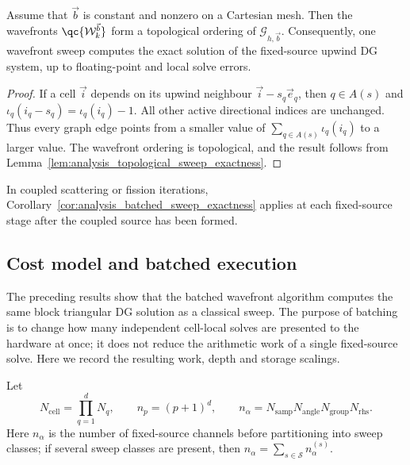 \documentclass[final]{amsart}
\begin{document}
\begin{corollary}
\label{cor:analysis_cartesian_wavefront_exactness}
Assume that $\vec b$ is constant and nonzero on a Cartesian mesh. Then
the wavefronts $\qc{\mathcal{W}^{\vec b}_k}$ form a topological ordering
of $\mathcal{G}_{h,\vec b}$. Consequently, one wavefront sweep computes
the exact solution of the fixed-source upwind DG system, up to
floating-point and local solve errors.
\end{corollary}

\begin{proof}
If a cell $\vec i$ depends on its upwind neighbour
$\vec i-s_q\vec e_q$, then $q\in A(s)$ and
$\iota_q(i_q-s_q)=\iota_q(i_q)-1$. All other active directional
indices are unchanged. Thus every graph
edge points from a smaller value of
$\sum_{q\in A(s)}\iota_q(i_q)$ to a larger value. The wavefront ordering
is topological, and the result follows from
Lemma~\ref{lem:analysis_topological_sweep_exactness}.
\end{proof}

In coupled scattering or fission iterations,
Corollary~\ref{cor:analysis_batched_sweep_exactness} applies at each
fixed-source stage after the coupled source has been formed.

\subsection{Cost model and batched execution}
\label{subsec:analysis_cost_model}

The preceding results show that the batched wavefront algorithm
computes the same block triangular DG solution as a classical sweep.
The purpose of batching is to change how many independent cell-local
solves are presented to the hardware at once; it does not reduce the
arithmetic work of a single fixed-source solve. Here we record the
resulting work, depth and storage scalings.

Let
\begin{equation}
N_{\mathrm{cell}}
=
\prod_{q=1}^d N_q,
\qquad
n_p=(p+1)^d,
\qquad
n_\alpha
=
N_{\mathrm{samp}}
N_{\mathrm{angle}}
N_{\mathrm{group}}
N_{\mathrm{rhs}}.
\end{equation}
Here $n_\alpha$ is the number of fixed-source channels before
partitioning into sweep classes; if several sweep classes are present,
then $n_\alpha=\sum_{s\in\mathcal{S}} n_\alpha^{(s)}$.
\end{document}
